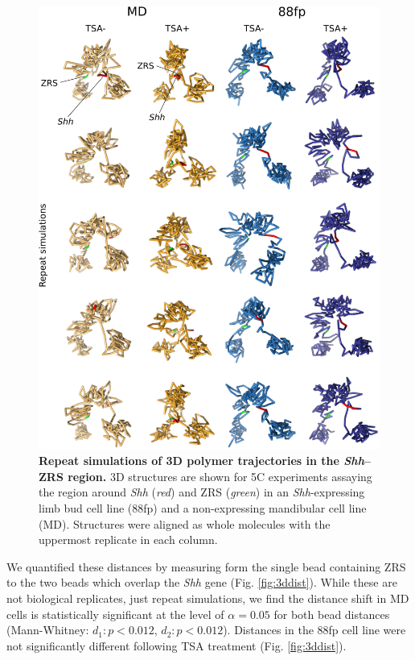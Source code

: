 \documentclass[a4paper,11pt,oneside]{book}
\begin{document}
\begin{figure}
\begin{center} 
\includegraphics[width=5.45in]{figs/3dreps.pdf}
\captionsetup{width=\textwidth} 
\caption[ Repeat simulations of 3D polymer trajectories in the \emph{Shh}--ZRS region. ]{ {\bf Repeat simulations of 3D polymer trajectories in the \emph{Shh}--ZRS region. }
3D structures are shown for 5C experiments assaying the region around \emph{Shh} (\emph{red}) and ZRS (\emph{green}) in an \emph{Shh}-expressing limb bud cell line (88fp) and a non-expressing mandibular cell line (MD). Structures were aligned as whole molecules with the uppermost replicate in each column.
}\label{fig:3dreps}
\end{center} 
\end{figure} 

We quantified these distances by measuring form the single bead containing ZRS to the two beads which overlap the \emph{Shh} gene (Fig. \ref{fig:3ddist}). While these are not biological replicates, just repeat simulations, we find the distance shift in MD cells is statistically significant at the level of $\alpha = 0.05$ for both bead distances (Mann-Whitney: $d_1: p < 0.012$, $d_2: p < 0.012 $). Distances in the 88fp cell line were not significantly different following TSA treatment (Fig. \ref{fig:3ddist}).
\end{document}
